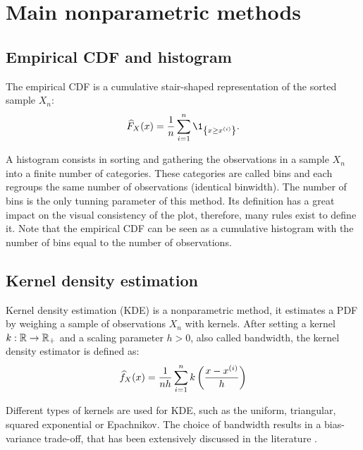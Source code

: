 \section{Main nonparametric methods}


\subsection*{Empirical CDF and histogram}
The empirical CDF is a cumulative stair-shaped representation of the sorted sample $X_n$:
\begin{equation}
    \what{F}_X(x) = \frac1n \sum_{i=1}^{n} \1_{\left\{x\geq x^{(i)}\right\}}.
\end{equation}

A histogram consists in sorting and gathering the observations in a sample $X_n$ into a finite number of categories. 
These categories are called bins and each regroups the same number of observations (identical binwidth). 
The number of bins is the only tunning parameter of this method. 
Its definition has a great impact on the visual consistency of the plot, therefore, many rules exist to define it.
Note that the empirical CDF can be seen as a cumulative histogram with the number of bins equal to the number of observations.


\subsection*{Kernel density estimation}
Kernel density estimation (KDE) is a nonparametric method, it estimates a PDF by weighing a sample of observations $X_n$ with kernels.  
After setting a kernel $k: \mathbb{R} \rightarrow \mathbb{R}_+$ and a scaling parameter $h>0$, also called bandwidth, the kernel density estimator is defined as:
\begin{equation}
    \widehat{f}_X(x) = \frac{1}{n h}\sum_{i=1}^{n} k\left(\frac{x - x^{(i)}}{h}\right)
\end{equation}

Different types of kernels are used for KDE, such as the uniform, triangular, squared exponential or Epachnikov. 
The choice of bandwidth results in a bias-variance trade-off, that has been extensively discussed in the literature .


